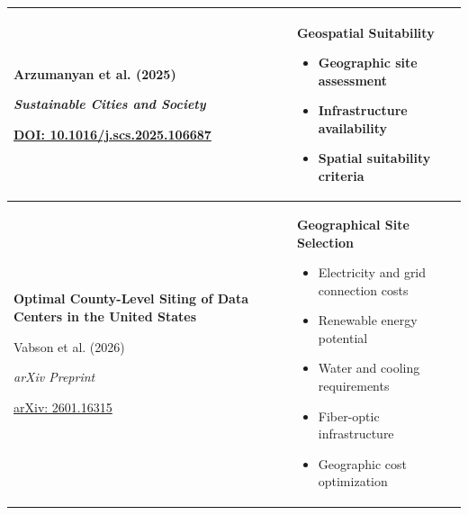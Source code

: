 \begin{longtable}{
    |p{8cm}|p{7cm}|
}
Arzumanyan et al. (2025)

\textit{Sustainable Cities and Society}

\href{https://doi.org/10.1016/j.scs.2025.106687}
{DOI: 10.1016/j.scs.2025.106687}
&
\textbf{Geospatial Suitability}
\begin{itemize}
    \setlength{\itemsep}{0pt}
    \setlength{\topsep}{0pt}
    \item Geographic site assessment
    \item Infrastructure availability
    \item Spatial suitability criteria
\end{itemize}
\\ \hline


\textbf{Optimal County-Level Siting of Data Centers
in the United States}

Vabson et al. (2026)

\textit{arXiv Preprint}

\href{https://arxiv.org/abs/2601.16315}
{arXiv: 2601.16315}
&
\textbf{Geographical Site Selection}
\begin{itemize}
    \setlength{\itemsep}{0pt}
    \setlength{\topsep}{0pt}
    \item Electricity and grid connection costs
    \item Renewable energy potential
    \item Water and cooling requirements
    \item Fiber-optic infrastructure
    \item Geographic cost optimization
\end{itemize}
\\ \hline


\end{longtable}

\normalsize

\vspace{0.3cm}


